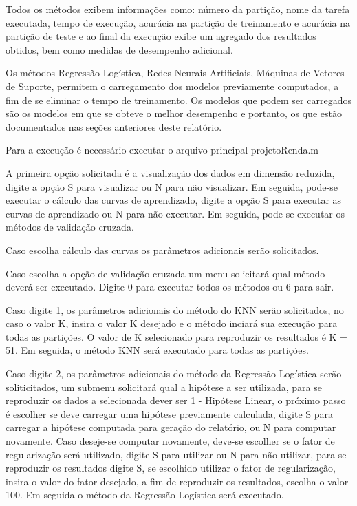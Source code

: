
Todos os métodos exibem informações como: número da partição, nome da tarefa executada, tempo de execução, acurácia na partição de treinamento e acurácia na partição de teste e ao final da execução exibe um agregado dos resultados obtidos, bem como medidas de desempenho adicional.

Os métodos Regressão Logística, Redes Neurais Artificiais, Máquinas de Vetores de Suporte, permitem o carregamento dos modelos previamente computados, a fim de se eliminar o tempo de treinamento. Os modelos que podem ser carregados são os modelos em que se obteve o melhor desempenho e portanto, os que estão documentados nas seções anteriores deste relatório.

Para a execução é necessário executar o arquivo principal projetoRenda.m

A primeira opção solicitada é a visualização dos dados em dimensão reduzida, digite a opção S para visualizar ou N para não visualizar. Em seguida, pode-se executar o cálculo das curvas de aprendizado, digite a opção S para executar as curvas de aprendizado ou N para não executar. Em seguida, pode-se executar os métodos de validação cruzada.

Caso escolha cálculo das curvas os parâmetros adicionais serão solicitados.

Caso escolha a opção de validação cruzada um menu solicitará qual método deverá ser executado. Digite 0 para executar todos os métodos ou 6 para sair.

Caso digite 1, os parâmetros adicionais do método do KNN serão solicitados, no caso o valor K, insira o valor K desejado e o método inciará sua execução para todas as partições. O valor de K selecionado para reproduzir os resultados é K = 51. Em seguida, o método KNN será executado para todas as partições.

Caso digite 2, os parâmetros adicionais do método da Regressão Logística serão soliticitados, um submenu solicitará qual a hipótese a ser utilizada, para se reproduzir os dados a selecionada dever ser 1 - Hipótese Linear, o próximo passo é escolher se deve carregar uma hipótese previamente calculada, digite S para carregar a hipótese computada para geração do relatório, ou N para computar novamente. Caso deseje-se computar novamente, deve-se escolher se o fator de regularização será utilizado, digite S para utilizar ou N para não utilizar, para se reproduzir os resultados digite S, se escolhido utilizar o fator de regularização, insira o valor do fator desejado, a fim de reproduzir os resultados, escolha o valor 100. Em seguida o método da Regressão Logística será executado.

